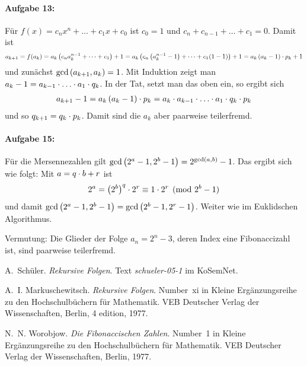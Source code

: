 \documentclass[11pt,a4paper]{article}
\begin{document}
\paragraph{Aufgabe 13:}
Für $f(x)=c_nx^n+\dots+c_1x+c_0$ ist $c_0=1$ und $c_n+c_{n-1}+\dots+c_1=0$.
Damit ist
\begin{gather*}
  a_{k+1}=f(a_k)=a_k\left(c_na_k^{n-1}+\dots+c_1\right)+1
  =a_k\left(c_n\left(a_k^{n-1}-1\right)+\dots+c_1(1-1)\right)+1=a_k\left(a_k-1\right)\cdot p_k+1
\end{gather*}
und zunächst $\gcd\left(a_{k+1},a_k\right)=1$.  Mit Induktion zeigt man
$a_k-1=a_{k-1}\m\dots\m a_1\m q_k$.  In der Tat, setzt man das oben ein, so
ergibt sich 
\begin{gather*}
  a_{k+1}-1=a_k\br{a_k-1}\m p_k=a_k\m a_{k-1}\m\dots\m a_1\m q_k\m p_k
\end{gather*}
und so $q_{k+1}=q_k\cdot p_k$.  Damit sind die $a_k$ aber paarweise
teilerfremd. 


\paragraph{Aufgabe 15:}
Für die Mersennezahlen gilt $\gcd\left(2^a-1,2^b-1\right)=2^{\gcd(a,b)}-1$.  Das
ergibt sich wie folgt: Mit $a=q\cdot b+r$ ist 
\begin{gather*}
  2^a=\left(2^b\right)^q\cdot 2^r\equiv 1\cdot 2^r \pmod{2^b-1}
\end{gather*}
und damit $\gcd\left(2^a-1,2^b-1\right)=\gcd\left(2^b-1,2^r-1\right)$.  Weiter wie im
Euklidschen Algorithmus.

Vermutung: Die Glieder der  Folge $a_n=2^n-3$, deren Index eine Fibonaccizahl
ist, sind paarweise teilerfremd.


\begin{thebibliography}{Wor77}

 A.~Schüler.  \newblock \emph{Rekursive Folgen}.  Text
  \emph{schueler-05-1} im KoSemNet.

 A.~I. Markuschewitsch.  \newblock
  \emph{{R}ekursive {F}olgen}.  \newblock Number~xi in Kleine
  Erg{\"a}nzungsreihe zu den Hochschulb{\"u}chern f{\"u}r Mathematik. VEB
  Deutscher Verlag der Wissenschaften, Berlin, 4 edition, 1977.

 N.~N. Worobjow.  \newblock \emph{Die Fibonaccischen
  Zahlen}.  \newblock Number~1 in Kleine Erg{\"a}nzungsreihe zu den
  Hochschulb{\"u}chern f{\"u}r Mathematik. VEB Deutscher Verlag der
  Wissenschaften, Berlin, 1977.

\end{thebibliography}
\end{document}
